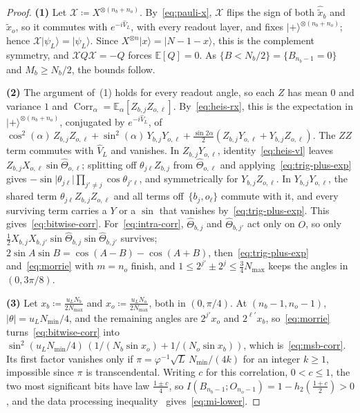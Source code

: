 \documentclass[11pt,a4paper]{article}
\theoremstyle{plain}
\theoremstyle{definition}
\theoremstyle{remark}
\newcommand{\Exp}{\mathbb{E}}
\newcommand{\Corr}{\operatorname{Corr}}
\newcommand{\ket}[1]{\lvert#1\rangle}
\begin{document}
\begin{proof}
  \textbf{(1)} Let \( \mathcal{X} \coloneqq X^{\otimes(n_b + n_o)} \). By~\eqref{eq:pauli-x},
  \( \mathcal{X} \) flips the sign of both \( \hat{\tilde{x}}_b \) and \( \hat{\tilde{x}}_o \), so
  it commutes with \( e^{-i\hat{V}_L} \), with every readout layer, and fixes
  \( \ket{+}^{\otimes(n_b + n_o)} \); hence \( \mathcal{X}\ket{\psi_L} = \ket{\psi_L} \). Since
  \( X^{\otimes n}\ket{x} = \ket{N - 1 - x} \), this is the complement symmetry, and
  \( \mathcal{X} Q \mathcal{X} = -Q \) forces \( \Exp[Q] = 0 \). As
  \( \{B < N_b / 2\} = \{B_{n_b - 1} = 0\} \) and \( M_b \ge N_b / 2 \), the bounds follow.

  \textbf{(2)} The argument of~(1) holds for every readout angle, so each \( Z \) has mean
  \( 0 \) and variance \( 1 \) and \( \Corr_\alpha = \Exp_\alpha[Z_{b,j} Z_{o,\ell}] \).
  By~\eqref{eq:heis-rx}, this is the expectation in \( \ket{+}^{\otimes(n_b + n_o)} \),
  conjugated by \( e^{-i\hat{V}_L} \), of
  \( \cos^2(\alpha)\, Z_{b,j} Z_{o,\ell} + \sin^2(\alpha)\, Y_{b,j} Y_{o,\ell} +
  \frac{\sin 2\alpha}{2}(Z_{b,j} Y_{o,\ell} + Y_{b,j} Z_{o,\ell}) \). The \( ZZ \) term
  commutes with \( \hat{V}_L \) and vanishes. In \( Z_{b,j} Y_{o,\ell} \),
  identity~\eqref{eq:heis-vl} leaves \( Z_{b,j} X_{o,\ell} \sin\hat{\Theta}_{o,\ell} \); splitting off
  \( \theta_{j\ell} Z_{b,j} \) from \( \hat{\Theta}_{o,\ell} \) and
  applying~\eqref{eq:trig-plus-exp} gives \( -\sin\lvert\theta_{j\ell}\rvert
  \prod_{j' \neq j} \cos\theta_{j'\ell} \), and symmetrically for \( Y_{b,j} Z_{o,\ell} \). In
  \( Y_{b,j} Y_{o,\ell} \), the shared term \( \theta_{j\ell} Z_{b,j} Z_{o,\ell} \) and all terms
  off~\( \{ b_j, o_\ell \} \) commute with it, and every surviving term carries a \( Y \) or a
  \( \sin \) that vanishes by~\eqref{eq:trig-plus-exp}. This gives~\eqref{eq:bitwise-corr}.
  For~\eqref{eq:intra-corr}, \( \hat{\Theta}_{b,j} \) and \( \hat{\Theta}_{b,j'} \) act only on
  \( O \), so only \( \frac{1}{2} X_{b,j} X_{b,j'} \sin\hat{\Theta}_{b,j}\sin\hat{\Theta}_{b,j'} \)
  survives; \( 2\sin A\sin B = \cos(A - B) - \cos(A + B) \), then~\eqref{eq:trig-plus-exp}
  and~\eqref{eq:morrie} with \( m = n_o \) finish, and
  \( 1 \le 2^{j'} \pm 2^j \le \frac{3}{4} N_{\max} \) keeps the angles in \( (0, 3\pi / 8) \).

  \textbf{(3)} Let \( x_b \coloneqq \frac{u_L N_b}{2 N_{\max}} \) and
  \( x_o \coloneqq \frac{u_L N_o}{2 N_{\max}} \), both in \( (0, \pi / 4) \). At
  \( (n_b - 1, n_o - 1) \), \( \lvert\theta\rvert = u_L N_{\min} / 4 \), and the remaining angles
  are \( 2^{j'} x_o \) and \( 2^{\ell'} x_b \), so~\eqref{eq:morrie} turns~\eqref{eq:bitwise-corr}
  into \( \sin^2(u_L N_{\min} / 4)\,(1 / (N_b \sin x_o) + 1 / (N_o \sin x_b)) \),
  which is~\eqref{eq:msb-corr}. Its first factor vanishes only if
  \( \pi = \varphi^{-1}\sqrt{L}\, N_{\min} / (4k) \) for an integer \( k \ge 1 \), impossible since
  \( \pi \) is transcendental. Writing \( c \) for this correlation, \( 0 < c \le 1 \), the two most significant
  bits have law \( \frac{1 \pm c}{4} \), so \( I(B_{n_b - 1}; O_{n_o - 1}) = 1 - h_2(\frac{1 + c}{2})
  > 0 \), and the data processing inequality~\cite{NielsenChuang} gives~\eqref{eq:mi-lower}.
\end{proof}
\end{document}
